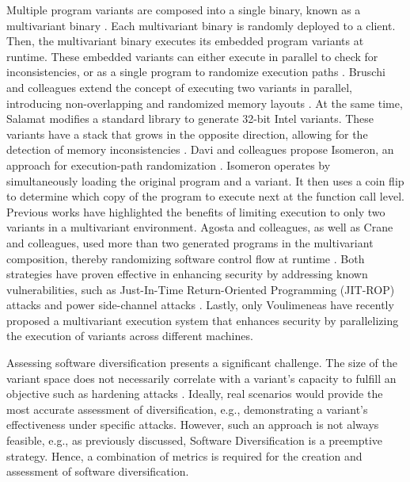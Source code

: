 \begin{strategy}
    Multiple program variants are composed into a single binary, known as a multivariant binary \cite{cox06}. 
    Each multivariant binary is randomly deployed to a client.
    Then, the multivariant binary executes its embedded program variants at runtime. 
    These embedded variants can either execute in parallel to check for inconsistencies, or as a single program to randomize execution paths \cite{bhatkar03}. 
    Bruschi and colleagues extend the concept of executing two variants in parallel, introducing non-overlapping and randomized memory layouts \cite{bruschi2007diversified}. 
    At the same time, Salamat \etal modifies a standard library to generate 32-bit Intel variants. 
    These variants have a stack that grows in the opposite direction, allowing for the detection of memory inconsistencies \cite{salamat2007stopping}. 
    Davi and colleagues propose Isomeron, an approach for execution-path randomization \cite{davi2015isomeron}. 
    Isomeron operates by simultaneously loading the original program and a variant. 
    It then uses a coin flip to determine which copy of the program to execute next at the function call level. 
    Previous works have highlighted the benefits of limiting execution to only two variants in a multivariant environment. 
    Agosta and colleagues, as well as Crane and colleagues, used more than two generated programs in the multivariant composition, thereby randomizing software control flow at runtime \cite{agosta2015meet, crane2015thwarting}. 
    Both strategies have proven effective in enhancing security by addressing known vulnerabilities, such as Just-In-Time Return-Oriented Programming (JIT-ROP) attacks \cite{jackson2011compiler} and power side-channel attacks \cite{amarilli2011can}. 
    Lastly, only Voulimeneas \etal \cite{voulimeneas2021dmvx} have recently proposed a multivariant execution system that enhances security by parallelizing the execution of variants across different machines.
\end{strategy}


Assessing software diversification presents a significant challenge. 
The size of the variant space does not necessarily correlate with a variant's capacity to fulfill an objective such as hardening attacks \cite{cohen1993operating}. 
Ideally, real scenarios would provide the most accurate assessment of diversification, e.g., demonstrating a variant's effectiveness under specific attacks. 
However, such an approach is not always feasible, e.g., as previously discussed, Software Diversification is a preemptive strategy. 
Hence, a combination of metrics is required for the creation and assessment of software diversification.

